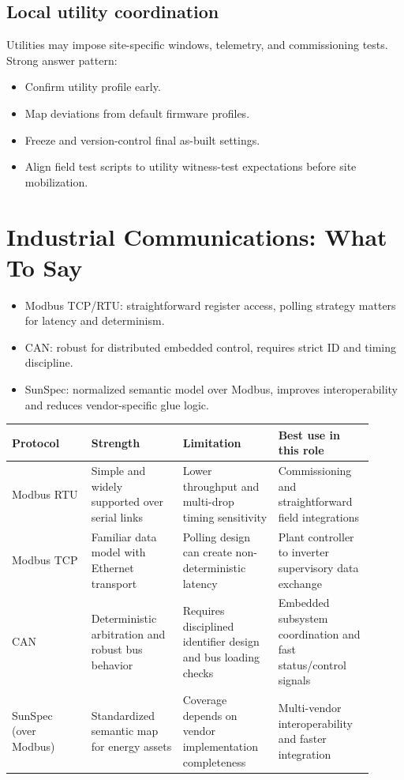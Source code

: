 \documentclass[11pt]{article}
\begin{document}
\subsection{Local utility coordination}
Utilities may impose site-specific windows, telemetry, and commissioning tests.
Strong answer pattern:
\begin{itemize}
  \item Confirm utility profile early.
  \item Map deviations from default firmware profiles.
  \item Freeze and version-control final as-built settings.
  \item Align field test scripts to utility witness-test expectations before site mobilization.
\end{itemize}

\section{Industrial Communications: What To Say}

\begin{itemize}
  \item Modbus TCP/RTU: straightforward register access, polling strategy matters for latency and determinism.
  \item CAN: robust for distributed embedded control, requires strict ID and timing discipline.
  \item SunSpec: normalized semantic model over Modbus, improves interoperability and reduces vendor-specific glue logic.
\end{itemize}

\begin{table}[h]
\centering
\begin{tabular}{p{0.2\linewidth}p{0.23\linewidth}p{0.24\linewidth}p{0.24\linewidth}}
\toprule
Protocol & Strength & Limitation & Best use in this role \\
\midrule
Modbus RTU & Simple and widely supported over serial links & Lower throughput and multi-drop timing sensitivity & Commissioning and straightforward field integrations \\
Modbus TCP & Familiar data model with Ethernet transport & Polling design can create non-deterministic latency & Plant controller to inverter supervisory data exchange \\
CAN & Deterministic arbitration and robust bus behavior & Requires disciplined identifier design and bus loading checks & Embedded subsystem coordination and fast status/control signals \\
SunSpec (over Modbus) & Standardized semantic map for energy assets & Coverage depends on vendor implementation completeness & Multi-vendor interoperability and faster integration \\
\bottomrule
\end{tabular}
\end{table}
\end{document}
